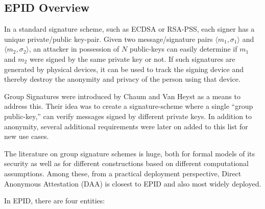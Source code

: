 \documentclass[letterpaper]{article}
\begin{document}
  \subsection{EPID Overview}
  \label{ssec:epid}
  In a standard signature scheme, such as ECDSA or RSA-PSS, each
  signer has a unique private/public key-pair. Given two
  message/signature pairs $\langle m_1, \sigma_1 \rangle$ and $\langle
  m_2, \sigma_2 \rangle$, an attacker in possession of $N$ public-keys
  can easily determine if $m_1$ and $m_2$ were signed by the same
  private key or not. If such signatures are generated by physical
  devices, it can be used to track the signing device and thereby
  destroy the anonymity and privacy of the person using that device.

  Group Signatures were introduced by Chaum and Van Heyst
  \cite{ChaumGroupSignatures} as a means to address this. Their idea
  was to create a signature-scheme where a single ``group
  public-key,'' can verify messages signed by different private
  keys. In addition to anonymity, several additional requirements were
  later on added to this list for new use cases.

  The literature on group signature schemes is huge, both for formal
  models of its security
  \cite{BMW03,dynamicGroupSignatures,fulldynamicgroupsignature} as
  well as for different constructions \cite{bbs, Furukawa2005,
    coalitionresistant, camenischLysyankaya} based on different
  computational assumptions. Among these, from a practical deployment
  perspective, Direct Anonymous Attestation \cite{daa, ucdaa} (DAA) is
  closest to EPID and also most widely deployed.


  In EPID, there are four entities:
\end{document}
